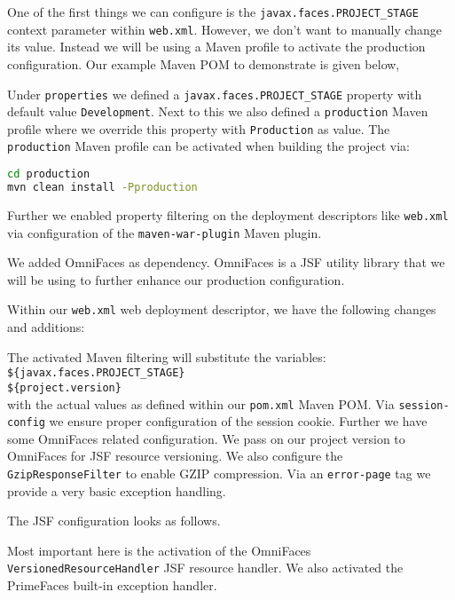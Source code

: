 One of the first things we can configure is the \texttt{javax.\allowbreak faces.PROJECT\_STAGE} context parameter within \texttt{web.xml}.
However, we don't want to manually change its value.
Instead we will be using a Maven profile to activate the production configuration.
Our example Maven POM to demonstrate is given below,

Under \texttt{properties} we defined a \texttt{javax.\allowbreak faces.PROJECT\_STAGE} property with default value \texttt{Development}.
Next to this we also defined a \texttt{production} Maven profile where we override this property with \texttt{Production} as value.
The \texttt{production} Maven profile can be activated when building the project via:
\begin{lstlisting}[language=bash]
cd production
mvn clean install -Pproduction
\end{lstlisting}
Further we enabled property filtering on the deployment descriptors like \texttt{web.xml} via configuration of the \texttt{maven\allowbreak-war\allowbreak-plugin} Maven plugin.

We added OmniFaces \cite{omnifaces} as dependency.
OmniFaces is a JSF utility library that we will be using to further enhance our production configuration.

Within our \texttt{web.xml} web deployment descriptor, we have the following changes and additions:

The activated Maven filtering will substitute the variables:\\
\indent \texttt{\$\{javax.faces.PROJECT\_STAGE\}}\\
\indent \texttt{\$\{project.version\}}\\
with the actual values as defined within our \texttt{pom.xml} Maven POM.
Via \texttt{session-config} we ensure proper configuration of the session cookie.
Further we have some OmniFaces related configuration.
We pass on our project version to OmniFaces for JSF resource versioning.
We also configure the \texttt{GzipResponseFilter} to enable GZIP compression.
Via an \texttt{error-page} tag we provide a very basic exception handling.

The JSF configuration looks as follows.

Most important here is the activation of the OmniFaces \texttt{VersionedResourceHandler} JSF resource handler.
We also activated the PrimeFaces built-in exception handler.

